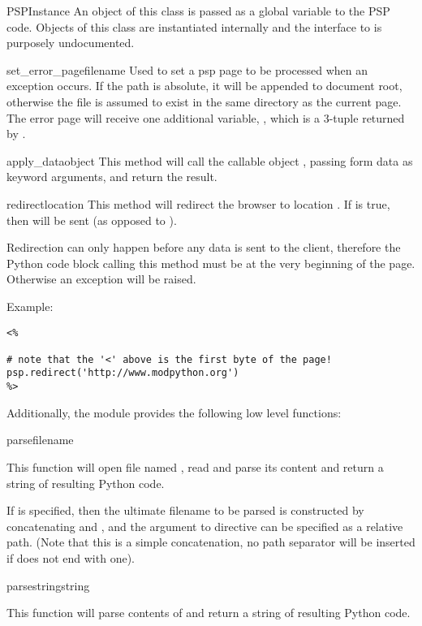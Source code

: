 \begin{classdesc}{PSPInstance}{}
  An object of this class is passed as a global variable  to
  the PSP code. Objects of this class are instantiated internally and
  the interface to  is purposely undocumented.

  \begin{methoddesc}[PSPInstance]{set_error_page}{filename}
    Used to set a psp page to be processed when an exception
    occurs. If the path is absolute, it will be appended to document
    root, otherwise the file is assumed to exist in the same directory
    as the current page. The error page will receive one additional
    variable, , which is a 3-tuple returned by
    .
  \end{methoddesc}

  \begin{methoddesc}[PSPInstance]{apply_data}{object}
    This method will call the callable object , passing form
    data as keyword arguments, and return the result.
  \end{methoddesc}

  \begin{methoddesc}[PSPInstance]{redirect}{location}
    This method will redirect the browser to location
    . If  is true, then
     will be sent (as opposed to
    ).

    \begin{notice}
      Redirection can only happen before any data is sent to the
      client, therefore the Python code block calling this method must
      be at the very beginning of the page. Otherwise an
       exception will be raised.
    \end{notice}

    Example:
    \begin{verbatim}
<%

# note that the '<' above is the first byte of the page!
psp.redirect('http://www.modpython.org')
%>
    \end{verbatim}
  \end{methoddesc}

\end{classdesc}

Additionally, the  module provides the following low level
functions:

\begin{funcdesc}{parse}{filename}

  This function will open file named , read and parse its
  content and return a string of resulting Python code.

  If  is specified, then the ultimate filename to be parsed
  is constructed by concatenating  and , and
  the argument to  directive can be specified as a
  relative path. (Note that this is a simple concatenation, no path
  separator will be inserted if  does not end with one).
\end{funcdesc}

\begin{funcdesc}{parsestring}{string}

  This function will parse contents of  and return a string
  of resulting Python code.

\end{funcdesc}
